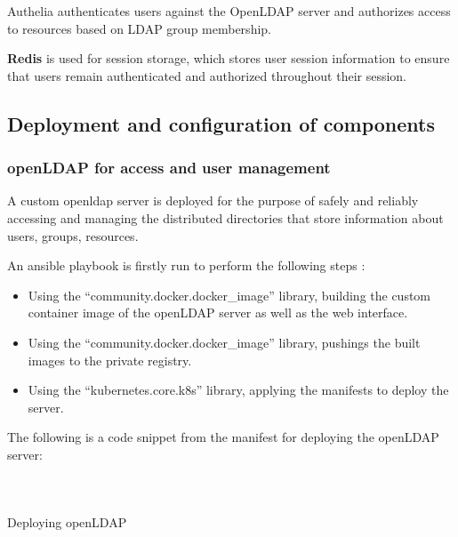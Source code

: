 Authelia authenticates users against the OpenLDAP server and authorizes access to resources based on LDAP group membership. 

\textbf{Redis} is used for session storage, which stores user session information to ensure that users remain authenticated and authorized throughout their session. 

 

\subsection{Deployment and configuration of components }

\subsubsection{openLDAP for access and user management  }

A custom openldap server is deployed for the purpose of safely and reliably accessing and managing the distributed directories that store information about users, groups, resources. 


An ansible playbook is firstly run to perform the following steps : 
\begin{itemize}[label={--}]
\item Using the “community.docker.docker\_image” library, building the custom container image of the openLDAP server as well as the web interface. 
\item Using the “community.docker.docker\_image” library, pushings the built images to the private registry. 
\item Using the “kubernetes.core.k8s” library, applying the manifests to deploy the server. 
\end{itemize}

The following is a code snippet from the manifest for deploying the openLDAP server: 

\begin{listing}[H]
\inputminted[firstline=1,lastline=10]{Yaml}{codeListing/deploy_openldap.yml}
\end{listing} 

\begin{listing}[H]
\inputminted[firstline=16,lastline=55]{Yaml}{codeListing/deploy_openldap.yml}
\end{listing} 

\begin{listing}[H]
\inputminted[firstline=56]{Yaml}{codeListing/deploy_openldap.yml}
\caption{Deploying openLDAP}
\label{lst:Deploying_openLDAP}
\end{listing} 

